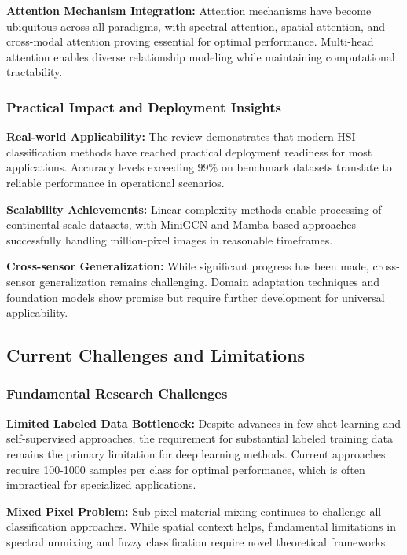 \documentclass[journal]{IEEEtran}
\begin{document}
\textbf{Attention Mechanism Integration:} Attention mechanisms have become ubiquitous across all paradigms, with spectral attention, spatial attention, and cross-modal attention proving essential for optimal performance. Multi-head attention enables diverse relationship modeling while maintaining computational tractability.

\subsubsection{Practical Impact and Deployment Insights}

\textbf{Real-world Applicability:} The review demonstrates that modern HSI classification methods have reached practical deployment readiness for most applications. Accuracy levels exceeding 99\% on benchmark datasets translate to reliable performance in operational scenarios.

\textbf{Scalability Achievements:} Linear complexity methods enable processing of continental-scale datasets, with MiniGCN and Mamba-based approaches successfully handling million-pixel images in reasonable timeframes.

\textbf{Cross-sensor Generalization:} While significant progress has been made, cross-sensor generalization remains challenging. Domain adaptation techniques and foundation models show promise but require further development for universal applicability.

\subsection{Current Challenges and Limitations}

\subsubsection{Fundamental Research Challenges}

\textbf{Limited Labeled Data Bottleneck:} Despite advances in few-shot learning and self-supervised approaches, the requirement for substantial labeled training data remains the primary limitation for deep learning methods. Current approaches require 100-1000 samples per class for optimal performance, which is often impractical for specialized applications.

\textbf{Mixed Pixel Problem:} Sub-pixel material mixing continues to challenge all classification approaches. While spatial context helps, fundamental limitations in spectral unmixing and fuzzy classification require novel theoretical frameworks.
\end{document}
